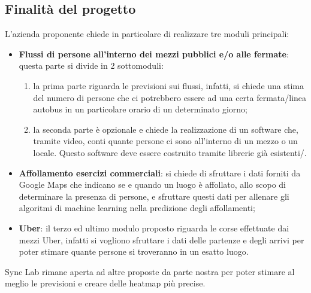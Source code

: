 \documentclass[../studio-di-fattibilita.tex]{subfiles}
\begin{document}
\subsection{Finalità del progetto}%
\label{sub:finalita_del_progetto}
L’azienda proponente chiede in particolare di realizzare tre moduli principali:
\begin{itemize}
  \item \textbf{Flussi di persone all’interno dei mezzi pubblici e/o alle fermate}: questa parte si divide in 2 sottomoduli:
  \begin{enumerate}
    \item la prima parte riguarda le previsioni sui flussi, infatti, si chiede una stima del numero di persone che ci potrebbero essere ad una certa fermata/linea autobus in un particolare orario di un determinato giorno;
    \item la seconda parte è opzionale e chiede la realizzazione di un software che, tramite video, conti quante persone ci sono all'interno di un mezzo o un locale. Questo software deve essere costruito tramite librerie già esistenti/.
  \end{enumerate}
  \item \textbf{Affollamento esercizi commerciali}: si chiede di sfruttare i dati forniti da Google Maps che indicano se e quando un luogo è affollato, allo scopo di determinare la presenza di persone, e sfruttare questi dati per allenare gli algoritmi di machine learning nella predizione degli affollamenti;
  \item \textbf{Uber}: il terzo ed ultimo modulo proposto riguarda le corse effettuate dai mezzi Uber, infatti si vogliono sfruttare i dati delle partenze e degli arrivi per poter stimare quante persone si troveranno in un esatto luogo.
\end{itemize}
Sync Lab rimane aperta ad altre proposte da parte nostra per poter stimare al meglio le previsioni e creare delle heatmap più precise.
\end{document}
